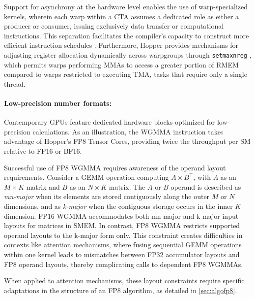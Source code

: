 Support for asynchrony at the hardware level enables the use of warp-specialized kernels, wherein each warp within a CTA assumes a dedicated role as either a producer or consumer, issuing exclusively data transfer or computational instructions. This separation facilitates the compiler’s capacity to construct more efficient instruction schedules \citep{warp-specialization-2011}. Furthermore, Hopper provides mechanisms for adjusting register allocation dynamically across warpgroups through \verb|setmaxnreg| \cite[\S9.7.17.1]{ptx}, which permits warps performing MMAs to access a greater portion of RMEM compared to warps restricted to executing TMA, tasks that require only a single thread.

\paragraph{Low-precision number formats:}
\label{sec:low-precision-gpu}
Contemporary GPUs feature dedicated hardware blocks optimized for low-precision calculations. As an illustration, the WGMMA instruction takes advantage of Hopper's FP8 Tensor Cores, providing twice the throughput per SM relative to FP16 or BF16.

Successful use of FP8 WGMMA requires awareness of the operand layout requirements. Consider a GEMM operation computing $A \times B^{\top}$, with $A$ as an $M \times K$ matrix and $B$ as an $N \times K$ matrix. The $A$ or $B$ operand is described as \emph{mn-major} when its elements are stored contiguously along the outer $M$ or $N$ dimensions, and as \emph{k-major} when the contiguous storage occurs in the inner $K$ dimension. FP16 WGMMA accommodates both mn-major and k-major input layouts for matrices in SMEM. In contrast, FP8 WGMMA restricts supported operand layouts to the k-major form only. This constraint creates difficulties in contexts like attention mechanisms, where fusing sequential GEMM operations within one kernel leads to mismatches between FP32 accumulator layouts and FP8 operand layouts, thereby complicating calls to dependent FP8 WGMMAs.

When applied to attention mechanisms, these layout constraints require specific adaptations in the structure of an FP8 algorithm, as detailed in \cref{sec:algofp8}.

